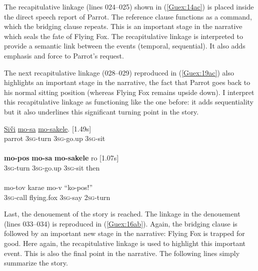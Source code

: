 \documentclass[output=paper]{LSP/langsci}
\begin{document}
The recapitulative linkage (lines 024--025) shown in (\ref{Guex:14ac}) is placed inside the direct speech report of Parrot. The reference clause functions as a command, which the bridging clause repeats. This is an important stage in the narrative which seals the fate of Flying Fox. The recapitulative linkage is interpreted to provide a semantic link between the events (temporal, sequential). It also adds emphasis and force to Parrot’s request. 

The next recapitulative linkage (028--029) reproduced in (\ref{Guex:19ac}) also highlights an important stage in the narrative, the fact that Parrot goes back to his normal sitting position (whereas Flying Fox remains upside down). I interpret this recapitulative linkage as functioning like the one before: it adds sequentiality but it also underlines this significant turning point in the story.

\begin{exe}
\ex \label{Guex:19ac}
\begin{xlist}
\ex \label{Guex:19a}
\gll \underline{Si\H{v}i}   \underline{}        \underline{mo-sa}        \underline{mo-sakele}.           [1.49s]\\
parrot   \textsc{3sg}-turn    \textsc{3sg}-go.up   \textsc{3sg}-sit \\
\glt {}\\
\ex \label{Guex:19b}
\gll \textbf{mo-pos}        \textbf{mo-sa}        \textbf{mo-sakele}          ro [1.07s]\\
\textsc{3sg}-turn    \textsc{3sg}-go.up   \textsc{3sg}-sit   then\\
\glt {}\\
\ex \label{Guex:19c}
\gll   mo-tov   karae     mo-v         ``ko-pos!''\\     	       
 \textsc{3sg}-call   flying.fox   \textsc{3sg}-say   \textsc{2sg}-turn\\
\glt {} 
\end{xlist}
\end{exe}

Last, the denouement of the story is reached. The linkage in the denouement (lines 033--034) is reproduced in (\ref{Guex:16ab}). Again, the bridging clause is followed by an important new stage in the narrative: Flying Fox is trapped for good. Here again, the recapitulative linkage  is used to highlight this important event. This is also the final point in the narrative. The following lines simply summarize the story. 
\end{document}
